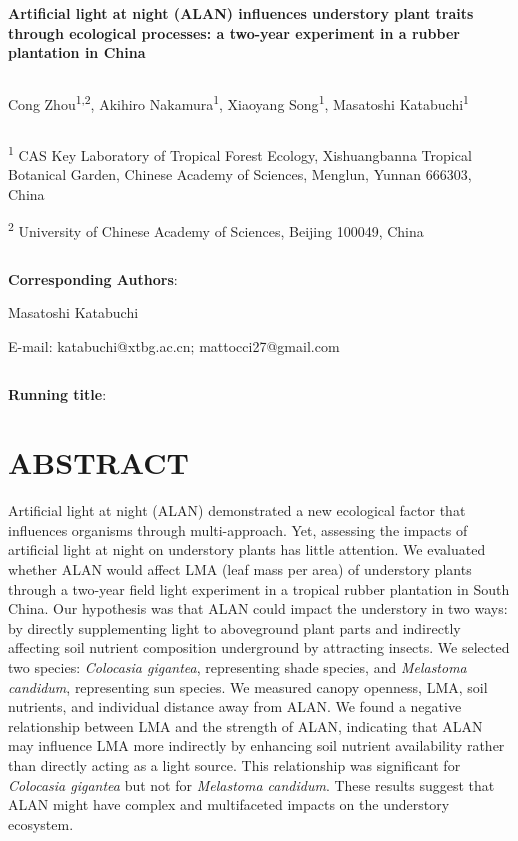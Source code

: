 \documentclass[
  12pt,
  letterpaper,
  DIV=11,
  numbers=noendperiod]{scrartcl}
\author{}
\date{}
\begin{document}
\ifdefined\Shaded\renewenvironment{Shaded}{\begin{tcolorbox}[sharp corners, interior hidden, enhanced, borderline west={3pt}{0pt}{shadecolor}, boxrule=0pt, breakable, frame hidden]}{\end{tcolorbox}}\fi

\textbf{Artificial light at night (ALAN) influences understory plant
traits through ecological processes: a two-year experiment in a rubber
plantation in China}

\[ \]

Cong Zhou\textsuperscript{1,2}, Akihiro Nakamura\textsuperscript{1},
Xiaoyang Song\textsuperscript{1}, Masatoshi Katabuchi\textsuperscript{1}

\[ \]

\textsuperscript{1} CAS Key Laboratory of Tropical Forest Ecology,
Xishuangbanna Tropical Botanical Garden, Chinese Academy of Sciences,
Menglun, Yunnan 666303, China

\textsuperscript{2} University of Chinese Academy of Sciences, Beijing
100049, China

\[ \]

\textbf{Corresponding Authors}:

Masatoshi Katabuchi

E-mail: katabuchi@xtbg.ac.cn; mattocci27@gmail.com

\[ \]

\textbf{Running title}:

\newpage

\hypertarget{abstract}{%
\section{ABSTRACT}\label{abstract}}

Artificial light at night (ALAN) demonstrated a new ecological factor
that influences organisms through multi-approach. Yet, assessing the
impacts of artificial light at night on understory plants has little
attention. We evaluated whether ALAN would affect LMA (leaf mass per
area) of understory plants through a two-year field light experiment in
a tropical rubber plantation in South China. Our hypothesis was that
ALAN could impact the understory in two ways: by directly supplementing
light to aboveground plant parts and indirectly affecting soil nutrient
composition underground by attracting insects. We selected two species:
\emph{Colocasia gigantea}, representing shade species, and
\emph{Melastoma candidum}, representing sun species. We measured canopy
openness, LMA, soil nutrients, and individual distance away from ALAN.
We found a negative relationship between LMA and the strength of ALAN,
indicating that ALAN may influence LMA more indirectly by enhancing soil
nutrient availability rather than directly acting as a light source.
This relationship was significant for \emph{Colocasia gigantea} but not
for \emph{Melastoma candidum}. These results suggest that ALAN might
have complex and multifaceted impacts on the understory ecosystem.
\end{document}

